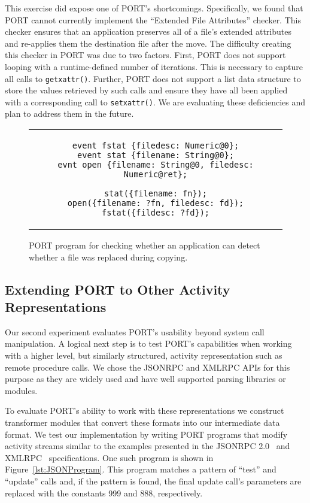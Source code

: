 This exercise did expose one of PORT's shortcomings.  Specifically,
we found that PORT cannot currently implement the ``Extended File
Attributes'' checker.
This checker ensures that an application
preserves all of a file's extended attributes and re-applies them the
destination file after the move.
The difficulty creating this checker
in PORT was due to two factors.
First, PORT does not support looping with a
runtime-defined number of iterations.  This is necessary to capture all
calls to {\tt getxattr()}.
Further, PORT does not support a list data structure to store the values
retrieved by such calls and ensure they have all been applied with a
corresponding call to {\tt setxattr()}.
We are evaluating these deficiencies and plan to address them in the
future.

\begin{figure}
\centering
\begin{tabular}{c}
\begin{lstlisting}
event fstat {filedesc: Numeric@0};
event stat {filename: String@0};
evnt open {filename: String@0, filedesc: Numeric@ret};

stat({filename: fn});
open({filename: ?fn, filedesc: fd});
fstat({fildesc: ?fd});
\end{lstlisting}
\end{tabular}
\caption{PORT program for checking whether an application can detect whether a file was replaced during copying.}
\label{lst:FileReplacedPORT}
\end{figure}

\subsection{Extending PORT to Other Activity Representations}

Our second experiment evaluates PORT's usability beyond system call manipulation.
A logical next step is to test PORT's capabilities when working
with a higher level, but similarly structured, activity representation such as remote procedure calls.
We chose the JSONRPC and XMLRPC APIs for this purpose as they are widely used and have well
supported parsing libraries or modules.

To evaluate PORT's ability to work with these representations we
construct transformer modules that convert these formats into our
intermediate data format.
We test our implementation by writing PORT programs that modify
activity streams similar to the examples presented in the JSONRPC
2.0~\cite{jsonspec} and XMLRPC~\cite{xmlspec}
specifications.  One such program is shown in
Figure~\ref{lst:JSONProgram}.  This program matches a pattern of ``test''
and ``update'' calls and, if the pattern is found, the final update call's
parameters are replaced with the constants 999 and 888, respectively.

